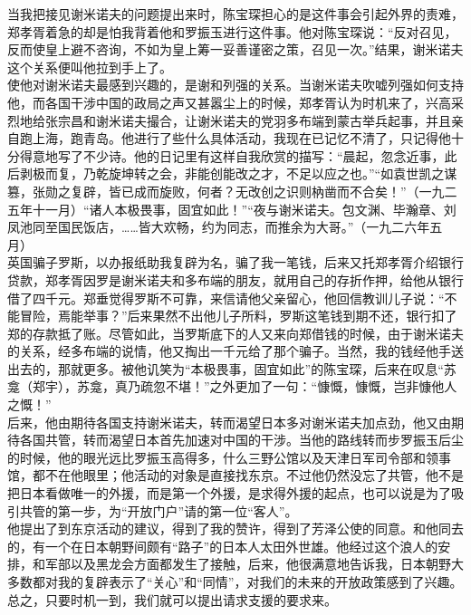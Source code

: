 当我把接见谢米诺夫的问题提出来时，陈宝琛担心的是这件事会引起外界的责难，郑孝胥着急的却是怕我背着他和罗振玉进行这件事。他对陈宝琛说：“反对召见，反而使皇上避不咨询，不如为皇上筹一妥善谨密之策，召见一次。”结果，谢米诺夫这个关系便叫他拉到手上了。\\

使他对谢米诺夫最感到兴趣的，是谢和列强的关系。当谢米诺夫吹嘘列强如何支持他，而各国干涉中国的政局之声又甚嚣尘上的时候，郑孝胥认为时机来了，兴高采烈地给张宗昌和谢米诺夫撮合，让谢米诺夫的党羽多布端到蒙古举兵起事，并且亲自跑上海，跑青岛。他进行了些什么具体活动，我现在已记忆不清了，只记得他十分得意地写了不少诗。他的日记里有这样自我欣赏的描写：“晨起，忽念近事，此后剥极而复，乃乾旋坤转之会，非能创能改之才，不足以应之也。”“如袁世凯之谋篡，张勋之复辟，皆已成而旋败，何者？无改创之识则枘凿而不合矣！”（一九二五年十一月）“诸人本极畏事，固宜如此！”“夜与谢米诺夫。包文渊、毕瀚章、刘凤池同至国民饭店，……皆大欢畅，约为同志，而推余为大哥。”（一九二六年五月）\\

英国骗子罗斯，以办报纸助我复辟为名，骗了我一笔钱，后来又托郑孝胥介绍银行贷款，郑孝胥因罗是谢米诺夫和多布端的朋友，就用自己的存折作押，给他从银行借了四千元。郑垂觉得罗斯不可靠，来信请他父亲留心，他回信教训儿子说：“不能冒险，焉能举事？”后来果然不出他儿子所料，罗斯这笔钱到期不还，银行扣了郑的存款抵了账。尽管如此，当罗斯底下的人又来向郑借钱的时候，由于谢米诺夫的关系，经多布端的说情，他又掏出一千元给了那个骗子。当然，我的钱经他手送出去的，那就更多。被他讥笑为“本极畏事，固宜如此”的陈宝琛，后来在叹息“苏龛（郑宇），苏龛，真乃疏忽不堪！”之外更加了一句：“慷慨，慷慨，岂非慷他人之慨！”\\

后来，他由期待各国支持谢米诺夫，转而渴望日本多对谢米诺夫加点劲，他又由期待各国共管，转而渴望日本首先加速对中国的干涉。当他的路线转而步罗振玉后尘的时候，他的眼光远比罗振玉高得多，什么三野公馆以及天津日军司令部和领事馆，都不在他眼里；他活动的对象是直接找东京。不过他仍然没忘了共管，他不是把日本看做唯一的外援，而是第一个外援，是求得外援的起点，也可以说是为了吸引共管的第一步，为“开放门户”请的第一位“客人”。\\

他提出了到东京活动的建议，得到了我的赞许，得到了芳泽公使的同意。和他同去的，有一个在日本朝野间颇有“路子”的日本人太田外世雄。他经过这个浪人的安排，和军部以及黑龙会方面都发生了接触，后来，他很满意地告诉我，日本朝野大多数都对我的复辟表示了“关心”和“同情”，对我们的未来的开放政策感到了兴趣。总之，只要时机一到，我们就可以提出请求支援的要求来。\\

